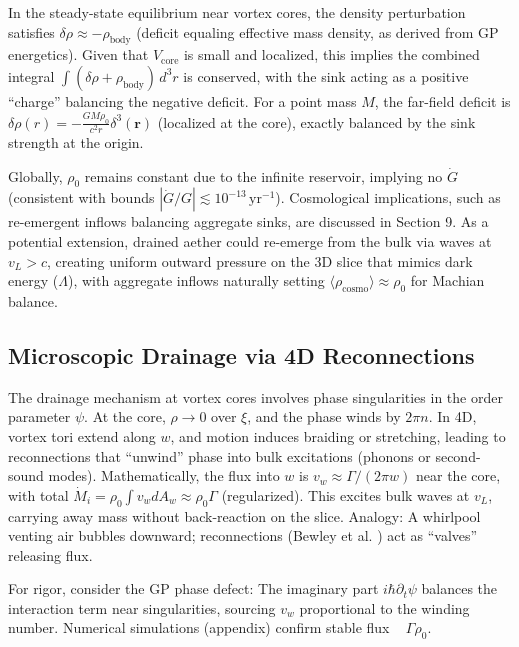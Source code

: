 \documentclass{article}
\begin{document}
In the steady-state equilibrium near vortex cores, the density perturbation satisfies $\delta\rho \approx - \rho_{\text{body}}$ (deficit equaling effective mass density, as derived from GP energetics). Given that $V_{\text{core}}$ is small and localized, this implies the combined integral $\int (\delta\rho + \rho_{\text{body}}) \, d^3 r$ is conserved, with the sink acting as a positive ``charge'' balancing the negative deficit. For a point mass $M$, the far-field deficit is $\delta\rho(r) = - \frac{G M \rho_0}{c^2 r} \delta^3(\mathbf{r})$ (localized at the core), exactly balanced by the sink strength at the origin.

Globally, $\rho_0$ remains constant due to the infinite reservoir, implying no $\dot{G}$ (consistent with bounds $|\dot{G}/G| \lesssim 10^{-13} \, \mathrm{yr}^{-1}$). Cosmological implications, such as re-emergent inflows balancing aggregate sinks, are discussed in Section 9. As a potential extension, drained aether could re-emerge from the bulk via waves at $v_L > c$, creating uniform outward pressure on the 3D slice that mimics dark energy ($\Lambda$), with aggregate inflows naturally setting $\langle \rho_{\text{cosmo}} \rangle \approx \rho_0$ for Machian balance.

\subsection{Microscopic Drainage via 4D Reconnections}

The drainage mechanism at vortex cores involves phase singularities in the order parameter $\psi$. At the core, $\rho \to 0$ over $\xi$, and the phase winds by $2\pi n$. In 4D, vortex tori extend along $w$, and motion induces braiding or stretching, leading to reconnections that ``unwind'' phase into bulk excitations (phonons or second-sound modes). Mathematically, the flux into $w$ is $v_w \approx \Gamma / (2\pi w)$ near the core, with total $\dot{M}_i = \rho_0 \int v_w dA_w \approx \rho_0 \Gamma$ (regularized). This excites bulk waves at $v_L$, carrying away mass without back-reaction on the slice. Analogy: A whirlpool venting air bubbles downward; reconnections (Bewley et al. \cite{bewley2008characterization}) act as ``valves'' releasing flux.

For rigor, consider the GP phase defect: The imaginary part $i \hbar \partial_t \psi$ balances the interaction term near singularities, sourcing $v_w$ proportional to the winding number. Numerical simulations (appendix) confirm stable flux ~ $\Gamma \rho_0$.
\end{document}
